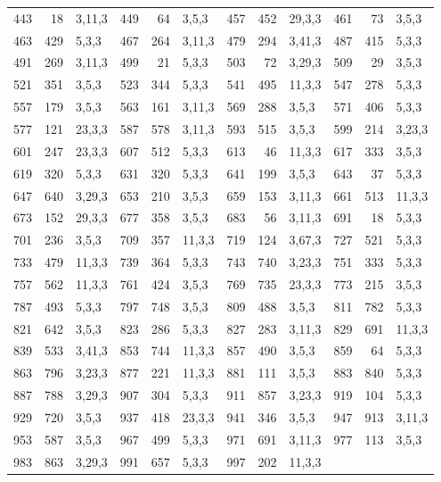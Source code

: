 \begin{tabular}{rrl|rrl|rrl|rrl}
443 & 18 & 3,11,3 & 449 & 64 & 3,5,3 & 457 & 452 & 29,3,3 & 461 & 73 & 3,5,3\\
463 & 429 & 5,3,3 & 467 & 264 & 3,11,3 & 479 & 294 & 3,41,3 & 487 & 415 & 5,3,3\\
491 & 269 & 3,11,3 & 499 & 21 & 5,3,3 & 503 & 72 & 3,29,3 & 509 & 29 & 3,5,3\\
521 & 351 & 3,5,3 & 523 & 344 & 5,3,3 & 541 & 495 & 11,3,3 & 547 & 278 & 5,3,3\\
557 & 179 & 3,5,3 & 563 & 161 & 3,11,3 & 569 & 288 & 3,5,3 & 571 & 406 & 5,3,3\\
577 & 121 & 23,3,3 & 587 & 578 & 3,11,3 & 593 & 515 & 3,5,3 & 599 & 214 & 3,23,3\\
601 & 247 & 23,3,3 & 607 & 512 & 5,3,3 & 613 & 46 & 11,3,3 & 617 & 333 & 3,5,3\\
619 & 320 & 5,3,3 & 631 & 320 & 5,3,3 & 641 & 199 & 3,5,3 & 643 & 37 & 5,3,3\\
647 & 640 & 3,29,3 & 653 & 210 & 3,5,3 & 659 & 153 & 3,11,3 & 661 & 513 & 11,3,3\\
673 & 152 & 29,3,3 & 677 & 358 & 3,5,3 & 683 & 56 & 3,11,3 & 691 & 18 & 5,3,3\\
701 & 236 & 3,5,3 & 709 & 357 & 11,3,3 & 719 & 124 & 3,67,3 & 727 & 521 & 5,3,3\\
733 & 479 & 11,3,3 & 739 & 364 & 5,3,3 & 743 & 740 & 3,23,3 & 751 & 333 & 5,3,3\\
757 & 562 & 11,3,3 & 761 & 424 & 3,5,3 & 769 & 735 & 23,3,3 & 773 & 215 & 3,5,3\\
787 & 493 & 5,3,3 & 797 & 748 & 3,5,3 & 809 & 488 & 3,5,3 & 811 & 782 & 5,3,3\\
821 & 642 & 3,5,3 & 823 & 286 & 5,3,3 & 827 & 283 & 3,11,3 & 829 & 691 & 11,3,3\\
839 & 533 & 3,41,3 & 853 & 744 & 11,3,3 & 857 & 490 & 3,5,3 & 859 & 64 & 5,3,3\\
863 & 796 & 3,23,3 & 877 & 221 & 11,3,3 & 881 & 111 & 3,5,3 & 883 & 840 & 5,3,3\\
887 & 788 & 3,29,3 & 907 & 304 & 5,3,3 & 911 & 857 & 3,23,3 & 919 & 104 & 5,3,3\\
929 & 720 & 3,5,3 & 937 & 418 & 23,3,3 & 941 & 346 & 3,5,3 & 947 & 913 & 3,11,3\\
953 & 587 & 3,5,3 & 967 & 499 & 5,3,3 & 971 & 691 & 3,11,3 & 977 & 113 & 3,5,3\\
983 & 863 & 3,29,3 & 991 & 657 & 5,3,3 & 997 & 202 & 11,3,3 &  &  & \\
\hline
\end{tabular}
